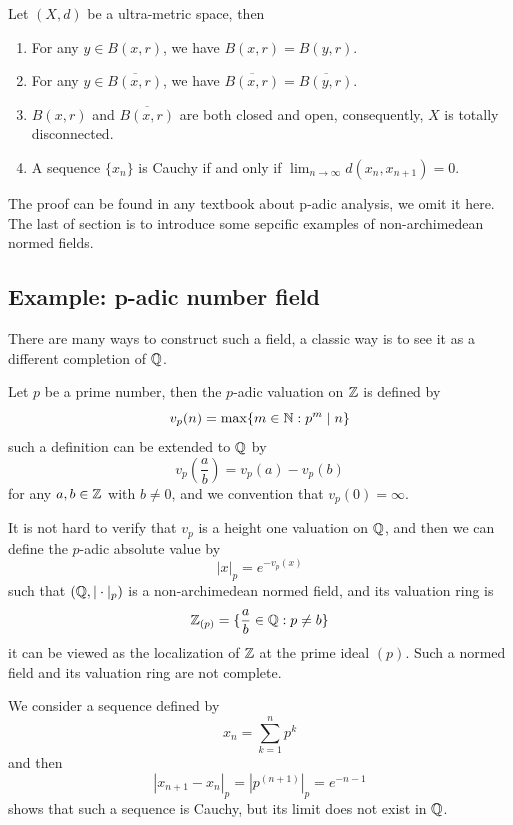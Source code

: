 \begin{lemma}
    Let \((X,d)\) be a ultra-metric space, then 
    \begin{enumerate}
        \item For any \(y \in B(x,r)\), we have \(B(x,r) = B(y,r)\).
        \item For any \(y \in \overline{B(x,r)}\), we have \(\overline{B(x,r)} = \overline{B(y,r)}\).
        \item \(B(x,r)\) and \(\overline{B(x,r)}\) are both closed and open, consequently, \(X\) is totally disconnected.
        \item A sequence \(\{x_n\}\) is Cauchy if and only if \(\lim_{n\to \infty} d(x_n,x_{n+1}) = 0\).
    \end{enumerate}
\end{lemma}

The proof can be found in any textbook about p-adic analysis, we omit it here. The last of section is to introduce some sepcific examples of non-archimedean normed fields.

\subsection*{Example: p-adic number field}

There are many ways to construct such a field, a classic way is to see it as a different completion of \(\mathbb{Q}\).

\begin{definition}
    Let \(p\) be a prime number, then the \(p\)-adic valuation on \(\mathbb{Z}\) is defined by
    \[v_p(n) = \max \{m \in \mathbb{N}: p^m \mid n \}\]
    such a definition can be extended to \(\mathbb{Q}\) by 
    \[v_p\left(\frac{a}{b}\right) = v_p(a) - v_p(b)\]
    for any \(a,b \in \mathbb{Z}\) with \(b \neq 0\), and we convention that \(v_p(0) = \infty\). 
\end{definition}
It is not hard to verify that \(v_p\) is a height one valuation on \(\mathbb{Q}\), and then we can define the \(p\)-adic absolute value by
\[|x|_p = e^{-v_p(x)}\]
such that \((\mathbb{Q},|\cdot|_p)\) is a non-archimedean normed field, and its valuation ring is
\[\mathbb{Z}_{(p)} = \{\frac{a}{b} \in \mathbb{Q} : p \neq b\}\]
it can be viewed as the localization of \(\mathbb{Z}\) at the prime ideal \((p)\). Such a normed field and its valuation ring are not complete.

\begin{example}
    We consider a sequence defined by
    \[x_n = \sum_{k = 1}^n p^{k }\]
    and then 
    \[|x_{n+1}-x_n|_p = |p^{(n+1)}|_p = e^{-n-1}\]
    shows that such a sequence is Cauchy, but its limit does not exist in \(\mathbb{Q}\).
\end{example}

